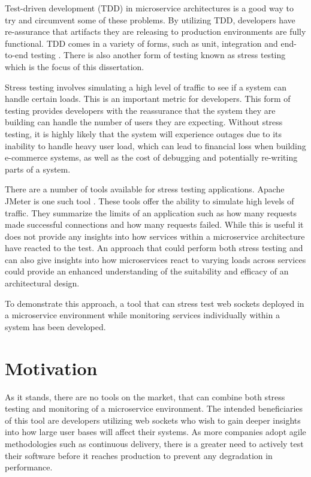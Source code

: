 Test-driven development (TDD) in microservice architectures is a good way to try and circumvent some of these problems. By utilizing TDD, developers have re-assurance that artifacts they are releasing to production environments are fully functional. TDD comes in a variety of forms, such as unit, integration and end-to-end testing \cite{7160271}. There is also another form of testing known as stress testing which is the focus of this dissertation.

Stress testing involves simulating a high level of traffic to see if a system can handle certain loads. This is an important metric for developers. This form of testing provides developers with the reassurance that the system they are building can handle the number of users they are expecting. Without stress testing, it is highly likely that the system will experience outages due to its inability to handle heavy user load, which can lead to financial loss when building e-commerce systems, as well as the cost of debugging and potentially re-writing parts of a system.

There are a number of tools available for stress testing applications. Apache JMeter is one such tool \cite{jmeter}. These tools offer the ability to simulate high levels of traffic. They summarize the limits of an application such as how many requests made successful connections and how many requests failed. While this is useful it does not provide any insights into how services within a microservice architecture have reacted to the test. An approach that could perform both stress testing and can also give insights into how microservices react to varying loads across services could provide an enhanced understanding of the suitability and efficacy of an architectural design. 

To demonstrate this approach, a tool that can stress test web sockets deployed in a microservice environment while monitoring services individually within a system has been developed.

\section{Motivation}

As it stands, there are no tools on the market, that can combine both stress testing and monitoring of a microservice environment. The intended beneficiaries of this tool are developers utilizing web sockets who wish to gain deeper insights into how large user bases will affect their systems. As more companies adopt agile methodologies such as continuous delivery, there is a greater need to actively test their software before it reaches production to prevent any degradation in performance.

